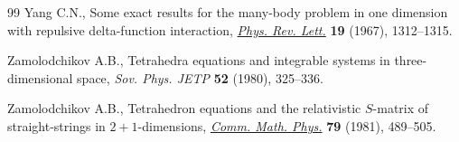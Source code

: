 \documentclass[10pt,a4paper]{amsart}
\numberwithin{equation}{section}
\theoremstyle{definition}
\begin{document}
\begin{thebibliography}{99}
Yang C.N., Some exact results for the many-body problem in one dimension with
 repulsive delta-function interaction,
 \href{https://doi.org/10.1103/PhysRevLett.19.1312}{\textit{Phys. Rev. Lett.}}
 \textbf{19} (1967), 1312--1315.

Zamolodchikov A.B., Tetrahedra equations and integrable systems in
 three-dimensional space, \textit{Sov. Phys. JETP} \textbf{52} (1980),
 325--336.

Zamolodchikov A.B., Tetrahedron equations and the relativistic {$S$}-matrix of
 straight-strings in {$2+1$}-dimensions,
 \href{https://doi.org/10.1007/BF01209309}{\textit{Comm. Math. Phys.}}
 \textbf{79} (1981), 489--505.

\end{thebibliography}
\end{document}
